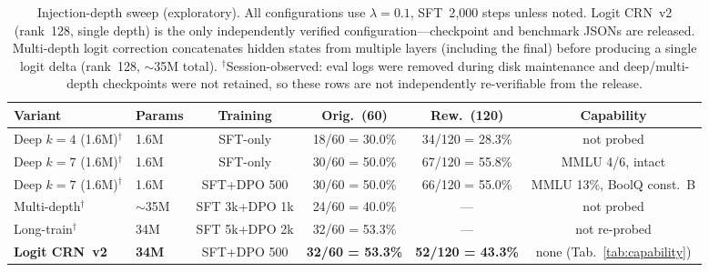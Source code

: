 \documentclass[11pt]{article}
\begin{document}
\begin{table}[ht]
\centering
\footnotesize
\setlength{\tabcolsep}{4pt}
\caption{Injection-depth sweep (exploratory). All configurations use $\lambda{=}0.1$, SFT~2{,}000 steps unless noted. Logit CRN~v2 (rank~128, single depth) is the only independently verified configuration---checkpoint and benchmark JSONs are released. Multi-depth logit correction concatenates hidden states from multiple layers (including the final) before producing a single logit delta (rank~128, $\sim$35M total). $^\dagger$Session-observed: eval logs were removed during disk maintenance and deep/multi-depth checkpoints were not retained, so these rows are not independently re-verifiable from the release.}
\begin{tabular}{@{}llcccc@{}}
\toprule
Variant & Params & Training & Orig.\ (60) & Rew.\ (120) & Capability \\
\midrule
Deep $k{=}4$ (1.6M)$^\dagger$ & 1.6M & SFT-only & 18/60 = 30.0\% & 34/120 = 28.3\% & not probed \\
Deep $k{=}7$ (1.6M)$^\dagger$ & 1.6M & SFT-only & 30/60 = 50.0\% & 67/120 = 55.8\% & MMLU 4/6, intact \\
Deep $k{=}7$ (1.6M)$^\dagger$ & 1.6M & SFT+DPO 500 & 30/60 = 50.0\% & 66/120 = 55.0\% & MMLU 13\%, BoolQ const.\ B \\
Multi-depth$^\dagger$ & $\sim$35M & SFT 3k+DPO 1k & 24/60 = 40.0\% & --- & not probed \\
Long-train$^\dagger$ & 34M & SFT 5k+DPO 2k & 32/60 = 53.3\% & --- & not re-probed \\
\midrule
\textbf{Logit CRN~v2} & \textbf{34M} & SFT+DPO 500 & \textbf{32/60 = 53.3\%} & \textbf{52/120 = 43.3\%} & none (Tab.~\ref{tab:capability}) \\
\bottomrule
\end{tabular}
\label{tab:depth}
\end{table}
\end{document}
